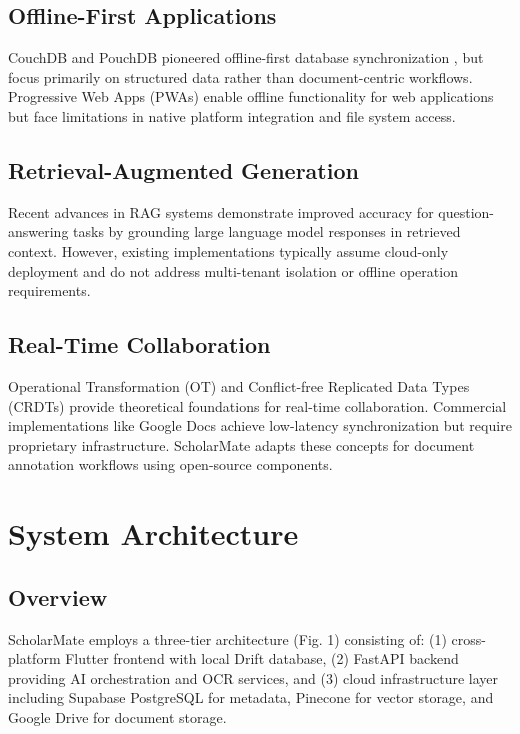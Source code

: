 \documentclass[conference]{IEEEtran}
\begin{document}
\subsection{Offline-First Applications}

CouchDB and PouchDB pioneered offline-first database synchronization \cite{b3}, but focus primarily on structured data rather than document-centric workflows. Progressive Web Apps (PWAs) enable offline functionality for web applications but face limitations in native platform integration and file system access.

\subsection{Retrieval-Augmented Generation}

Recent advances in RAG systems \cite{b4} demonstrate improved accuracy for question-answering tasks by grounding large language model responses in retrieved context. However, existing implementations typically assume cloud-only deployment and do not address multi-tenant isolation or offline operation requirements.

\subsection{Real-Time Collaboration}

Operational Transformation (OT) \cite{b5} and Conflict-free Replicated Data Types (CRDTs) \cite{b6} provide theoretical foundations for real-time collaboration. Commercial implementations like Google Docs achieve low-latency synchronization but require proprietary infrastructure. ScholarMate adapts these concepts for document annotation workflows using open-source components.

\section{System Architecture}

\subsection{Overview}

ScholarMate employs a three-tier architecture (Fig. 1) consisting of: (1) cross-platform Flutter frontend with local Drift database, (2) FastAPI backend providing AI orchestration and OCR services, and (3) cloud infrastructure layer including Supabase PostgreSQL for metadata, Pinecone for vector storage, and Google Drive for document storage.
\end{document}
